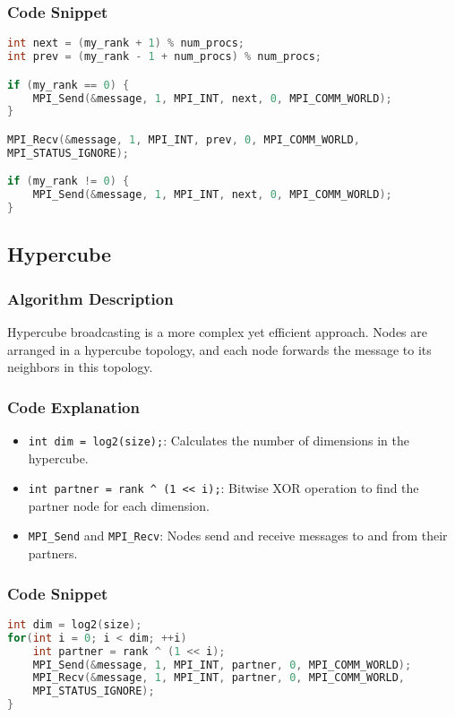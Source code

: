 \documentclass[11pt]{article}
\begin{document}
\subsubsection{Code Snippet}
\begin{lstlisting}[language=C++, caption=Key part of Sequential Ring]
int next = (my_rank + 1) % num_procs;
int prev = (my_rank - 1 + num_procs) % num_procs;

if (my_rank == 0) {
    MPI_Send(&message, 1, MPI_INT, next, 0, MPI_COMM_WORLD);
}

MPI_Recv(&message, 1, MPI_INT, prev, 0, MPI_COMM_WORLD, 
MPI_STATUS_IGNORE);

if (my_rank != 0) {
    MPI_Send(&message, 1, MPI_INT, next, 0, MPI_COMM_WORLD);
}
\end{lstlisting}

\subsection{Hypercube}

\subsubsection{Algorithm Description}
Hypercube broadcasting is a more complex yet efficient approach. Nodes are arranged in a hypercube topology, and each node forwards the message to its neighbors in this topology.

\subsubsection{Code Explanation}
\begin{itemize}
    \item \texttt{int dim = log2(size);}: Calculates the number of dimensions in the hypercube.
    \item \texttt{int partner = rank \^{} (1 << i);}: Bitwise XOR operation to find the partner node for each dimension.
    \item \texttt{MPI\_Send} and \texttt{MPI\_Recv}: Nodes send and receive messages to and from their partners.
\end{itemize}

\subsubsection{Code Snippet}
\begin{lstlisting}[language=C++, caption=Key part of Hypercube]
int dim = log2(size);
for(int i = 0; i < dim; ++i) 
    int partner = rank ^ (1 << i);
    MPI_Send(&message, 1, MPI_INT, partner, 0, MPI_COMM_WORLD);
    MPI_Recv(&message, 1, MPI_INT, partner, 0, MPI_COMM_WORLD, 
    MPI_STATUS_IGNORE);
}
\end{lstlisting}
\end{document}
